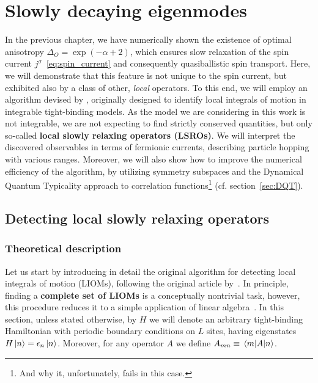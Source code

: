 \chapter{Slowly decaying eigenmodes\label{chap:currents}}
\thispagestyle{chapterBeginStyle}

In the previous chapter, we have numerically shown the existence of optimal anisotropy
\(\Delta_{O} = \exp(- \alpha + 2)\), which ensures slow relaxation of the spin current
 \(j^{\sigma}\)~\eqref{eq:spin_current} and consequently quasiballistic spin transport.
 Here, we will demonstrate that this feature is not unique to the spin current, but
 exhibited also by a class of other, \textit{local} operators. To this end, we will
 employ an algorithm devised by \textcite{Mierzejewski2015a}, originally designed to
 identify local integrals of motion in integrable tight-binding models. As the model
 we are considering in this work is not integrable, we are not expecting to find
 strictly conserved quantities, but only so-called \textbf{local slowly relaxing
 operators (LSROs)}. We will interpret the discovered observables in terms of
 fermionic currents, describing particle hopping with various ranges.
 Moreover, we will also show how to improve the numerical efficiency of
 the algorithm, by utilizing symmetry subspaces and the Dynamical Quantum Typicality
 approach to correlation functions\footnote{And why it, unfortunately, fails in this case.}
(cf. section~\ref{sec:DQT}).


\section{Detecting local slowly relaxing operators \label{sec:slowly_relaxing_operators}}
\subsection{Theoretical description}
Let us start by introducing in detail the original algorithm for detecting local integrals
of motion (LIOMs), following the original article by~\autocite{Mierzejewski2015a}.
In principle, finding a \textbf{complete set of LIOMs} is a conceptually
nontrivial task, however, this procedure reduces it to a simple application of linear algebra~\autocite{Mierzejewski2015a}.
In this section, unless stated otherwise, by \(H\) we will denote an arbitrary
tight-binding Hamiltonian with periodic boundary conditions
on \(L\) sites, having eigenstates \(H \ket{n} = \epsilon_{n} \ket{n}\). Moreover,
for any operator \(A\) we define \(A_{mn} \equiv \matrixel{m}{A}{n}\).


